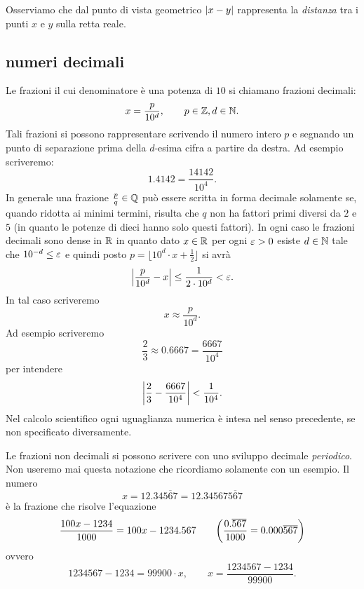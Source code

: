 Osserviamo che dal punto di vista geometrico
${\left|x-y\right|}$ rappresenta la \emph{distanza} tra i punti
$x$ e $y$ sulla retta reale.

\subsection{numeri decimali}
%
Le frazioni il cui denominatore è una potenza
di $10$ si chiamano frazioni decimali:
\[
  x = \frac{p}{10^d}, \qquad p\in {\mathbb Z}, d\in {\mathbb N}.
\]
Tali frazioni si possono rappresentare
scrivendo il numero
intero $p$ e segnando un punto%
%
di separazione
prima della $d$-esima cifra a partire da destra.
Ad esempio scriveremo:
\[
  1.4142 = \frac{14142}{10^4}.
\]
In generale una frazione $\frac{p}{q}\in {\mathbb Q}$
può essere scritta in forma decimale solamente
se, quando ridotta ai minimi termini,
risulta che $q$ non ha fattori primi diversi
da $2$ e $5$ (in quanto le potenze di dieci
hanno solo questi fattori).
In ogni caso le frazioni decimali sono dense in ${\mathbb R}$
in quanto dato $x\in {\mathbb R}$ per ogni $\varepsilon>0$ esiste
$d\in {\mathbb N}$ tale che $10^{-d}\le\varepsilon$ e quindi
posto $p=\lfloor 10^d\cdot x + \frac 1 2\rfloor$
si avrà
\[
    {\left|\frac{p}{10^d} - x\right|} \le \frac{1}{2\cdot 10^d} < \varepsilon.
\]
In tal caso scriveremo
\mymargin{$\approx$}
\[
  x \approx \frac{p}{10^d}.
\]
Ad esempio scriveremo
\[
  \frac 2 3 \approx 0.6667 = \frac{6667}{10^4}
\]
per intendere%
%
\begin{equation}\label{eq:approx_23}
{\left|\frac 2 3 - \frac{6667}{10^4}\right|}<\frac{1}{10^4}.
\end{equation}
Nel calcolo scientifico ogni uguaglianza numerica è intesa nel 
senso precedente, se non specificato diversamente. 

Le frazioni non decimali si possono scrivere con uno sviluppo
decimale \emph{periodico}. 
Non useremo mai questa notazione
che ricordiamo solamente con un esempio.
Il numero
\[
  x = 12.34\overline{567}
    = 12.34567\overline{567}
\]
è la frazione che risolve l'equazione
\[
  \frac{100x - 1234}{1000}
  = 100x-1234.567
  \qquad
{\left( \frac{0.\overline{567}}{1000}
= 0.000\overline{567}  \right)}
\]
ovvero
\[
  1234567 - 1234 = 99900 \cdot x,
  \qquad x = \frac{1234567-1234}{99900}.
\]

